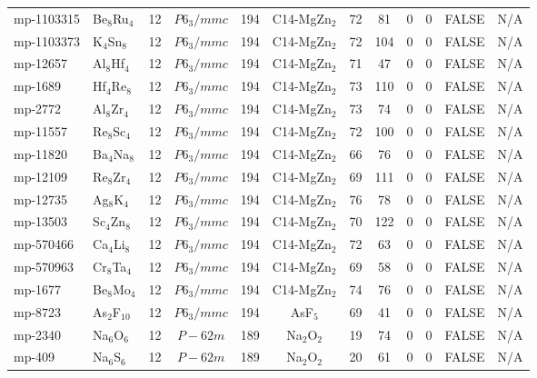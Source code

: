 {\begin{longtable}{llcccccccccc}
    mp-1103315 & Be$_{8}$Ru$_{4}$ & 12    & $P6_3/mmc$ & 194   & C14-MgZn$_{2}$ & 72    & 81    & 0     & 0     & FALSE & N/A \\
    mp-1103373 & K$_{4}$Sn$_{8}$ & 12    & $P6_3/mmc$ & 194   & C14-MgZn$_{2}$ & 72    & 104   & 0     & 0     & FALSE & N/A \\
    mp-12657 & Al$_{8}$Hf$_{4}$ & 12    & $P6_3/mmc$ & 194   & C14-MgZn$_{2}$ & 71    & 47    & 0     & 0     & FALSE & N/A \\
    mp-1689 & Hf$_{4}$Re$_{8}$ & 12    & $P6_3/mmc$ & 194   & C14-MgZn$_{2}$ & 73    & 110   & 0     & 0     & FALSE & N/A \\
    mp-2772 & Al$_{8}$Zr$_{4}$ & 12    & $P6_3/mmc$ & 194   & C14-MgZn$_{2}$ & 73    & 74    & 0     & 0     & FALSE & N/A \\
    mp-11557 & Re$_{8}$Sc$_{4}$ & 12    & $P6_3/mmc$ & 194   & C14-MgZn$_{2}$ & 72    & 100   & 0     & 0     & FALSE & N/A \\
    mp-11820 & Ba$_{4}$Na$_{8}$ & 12    & $P6_3/mmc$ & 194   & C14-MgZn$_{2}$ & 66    & 76    & 0     & 0     & FALSE & N/A \\
    mp-12109 & Re$_{8}$Zr$_{4}$ & 12    & $P6_3/mmc$ & 194   & C14-MgZn$_{2}$ & 69    & 111   & 0     & 0     & FALSE & N/A \\
    mp-12735 & Ag$_{8}$K$_{4}$ & 12    & $P6_3/mmc$ & 194   & C14-MgZn$_{2}$ & 76    & 78    & 0     & 0     & FALSE & N/A \\
    mp-13503 & Sc$_{4}$Zn$_{8}$ & 12    & $P6_3/mmc$ & 194   & C14-MgZn$_{2}$ & 70    & 122   & 0     & 0     & FALSE & N/A \\
    mp-570466 & Ca$_{4}$Li$_{8}$ & 12    & $P6_3/mmc$ & 194   & C14-MgZn$_{2}$ & 72    & 63    & 0     & 0     & FALSE & N/A \\
    mp-570963 & Cr$_{8}$Ta$_{4}$ & 12    & $P6_3/mmc$ & 194   & C14-MgZn$_{2}$ & 69    & 58    & 0     & 0     & FALSE & N/A \\
    mp-1677 & Be$_{8}$Mo$_{4}$ & 12    & $P6_3/mmc$ & 194   & C14-MgZn$_{2}$ & 74    & 76    & 0     & 0     & FALSE & N/A \\
    mp-8723 & As$_{2}$F$_{10}$ & 12    & $P6_3/mmc$ & 194   & AsF$_{5}$ & 69    & 41    & 0     & 0     & FALSE & N/A \\
    mp-2340 & Na$_{6}$O$_{6}$ & 12    & $P-62m$ & 189   & Na$_{2}$O$_{2}$ & 19    & 74    & 0     & 0     & FALSE & N/A \\
    mp-409 & Na$_{6}$S$_{6}$ & 12    & $P-62m$ & 189   & Na$_{2}$O$_{2}$ & 20    & 61    & 0     & 0     & FALSE & N/A \\

\end{longtable}}
